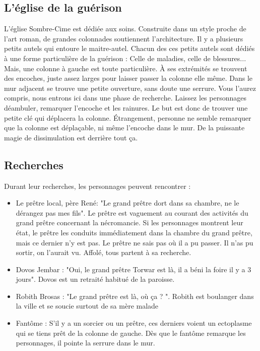\documentclass[a4paper]{article}
\begin{document}
\subsection{L'église de la guérison}
L'église Sombre-Cime est dédiée aux soins. Construite dans un style proche de l'art roman, de grandes colonnades soutiennent l'architecture. Il y a plusieurs petits autels qui entoure le maitre-autel. Chacun des ces petits autels sont dédiés à une forme particulière de la guérison : Celle de maladies, celle de blessures... Mais, une colonne à gauche est toute particulière. À ses extrémités se trouvent des encoches, juste assez larges pour laisser passer la colonne elle même. Dans le mur adjacent se trouve une petite ouverture, sans doute une serrure. Vous l'aurez compris, nous entrons ici dans une phase de recherche. Laissez les personnages déambuler, remarquer l'encoche et les rainures. Le but est donc de trouver une petite clé qui déplacera la colonne. Étrangement, personne ne semble remarquer que la colonne est déplaçable, ni même l'encoche dans le mur. De la puissante magie de dissimulation est derrière tout ça.

\subsection{Recherches}
Durant leur recherches, les personnages peuvent rencontrer :
\begin{itemize}
\item Le prêtre local, père René: "Le grand prêtre dort dans sa chambre, ne le dérangez pas mes fils". Le prêtre est vaguement au courant des activités du grand prêtre concernant la nécromancie. Si les personnages montrent leur état, le prêtre les conduits immédiatement dans la chambre du grand prêtre, mais ce dernier n'y est pas. Le prêtre ne sais pas où il a pu passer. Il n'as pu sortir, on l’aurait vu. Affolé, tous partent à sa recherche.
\item Dovos Jembar : "Oui, le grand prêtre Torwar est là, il a béni la foire il y a 3 jours". Dovos est un retraité habitué de la paroisse.
\item Robith Brosas : "Le grand prêtre est là, où ça ? ". Robith est boulanger dans la ville et se soucie surtout de sa mère malade
\item Fantôme : S'il y a un sorcier ou un prêtre, ces derniers voient un ectoplasme qui se tiens prêt de la colonne de gauche. Dès que le fantôme remarque les personnages, il pointe la serrure dans le mur.
\end{itemize}
\end{document}

